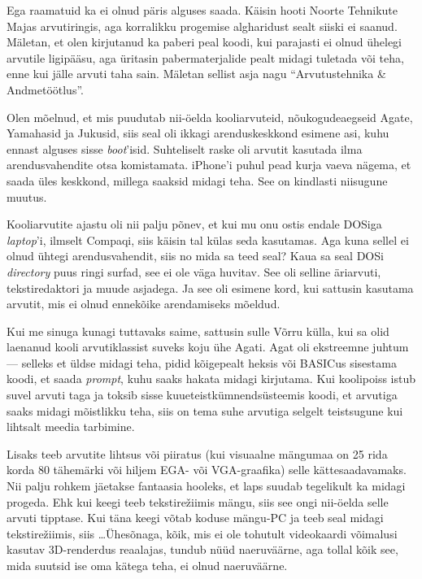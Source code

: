 Ega raamatuid ka ei olnud päris alguses saada. Käisin hooti
Noorte Tehnikute Majas 
arvutiringis, aga korralikku progemise algharidust sealt siiski ei saanud. Mäletan, et 
olen kirjutanud ka paberi peal koodi, kui parajasti 
ei olnud ühelegi arvutile ligipääsu, aga üritasin pabermaterjalide pealt 
midagi tuletada või teha, enne kui jälle arvuti taha sain. Mäletan sellist asja nagu
\enquote{Arvutustehnika \& Andmetöötlus}. 


Olen mõelnud, et mis puudutab 
nii-öelda kooliarvuteid, nõukogudeaegseid Agate, 
Yamahasid ja Jukusid, siis seal oli 
ikkagi arenduskeskkond esimene asi, kuhu ennast alguses sisse 
\emph{boot}'isid. Suhteliselt raske oli arvutit kasutada ilma
arendusvahendite otsa komistamata. iPhone'i puhul pead kurja 
vaeva nägema, et saada üles keskkond, millega saaksid midagi teha. See 
on kindlasti niisugune muutus. 

Kooliarvutite ajastu oli nii 
palju põnev, et kui mu onu ostis endale DOSiga \emph{laptop}'i, ilmselt Compaqi, siis käisin tal külas seda kasutamas. Aga kuna sellel ei olnud ühtegi arendusvahendit, siis no mida sa 
teed seal? Kaua sa seal DOSi \emph{directory} puus ringi surfad, see ei ole väga huvitav. See oli selline äriarvuti, tekstiredaktori ja muude asjadega. Ja see oli
esimene kord, kui 
sattusin kasutama arvutit, mis ei olnud ennekõike arendamiseks mõeldud. 

Kui me sinuga kunagi tuttavaks saime, sattusin sulle Võrru 
külla, kui sa olid laenanud kooli arvutiklassist suveks koju ühe 
Agati. Agat oli ekstreemne juhtum --- selleks et üldse midagi teha, pidid kõigepealt heksis või BASICus 
sisestama koodi, et saada \emph{prompt}, kuhu saaks hakata midagi 
kirjutama. Kui koolipoiss istub suvel arvuti taga ja toksib sisse 
kuueteistkümnendsüsteemis koodi, et arvutiga saaks midagi 
mõistlikku teha, siis on tema suhe arvutiga selgelt teistsugune kui 
lihtsalt meedia tarbimine. 

Lisaks teeb arvutite lihtsus või piiratus (kui 
visuaalne mängumaa on 25 rida korda 80 tähemärki või hiljem EGA- või 
VGA-graafika) selle kättesaadavamaks. Nii palju rohkem jäetakse 
fantaasia hooleks, et laps suudab tegelikult ka midagi progeda. Ehk kui keegi 
teeb tekstirežiimis mängu, siis see ongi nii-öelda selle arvuti tipptase. 
Kui täna keegi võtab koduse mängu-PC ja teeb seal midagi 
tekstirežiimis, siis \dots Ühesõnaga, kõik, mis ei ole tohutult videokaardi 
võimalusi kasutav 3D-renderdus reaalajas, tundub nüüd naeruväärne, aga tollal 
kõik see, mida suutsid ise oma kätega teha, ei olnud naeruväärne. 


